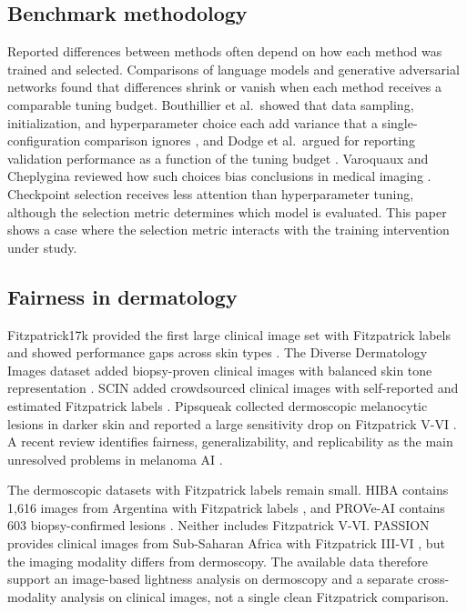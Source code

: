 \documentclass[11pt]{article}
\begin{document}
\subsection{Benchmark methodology}

Reported differences between methods often depend on how each method was trained and selected. Comparisons of language models \citep{melis2018evaluation} and generative adversarial networks \citep{lucic2018gans} found that differences shrink or vanish when each method receives a comparable tuning budget. Bouthillier et al.\ showed that data sampling, initialization, and hyperparameter choice each add variance that a single-configuration comparison ignores \citep{bouthillier2021variance}, and Dodge et al.\ argued for reporting validation performance as a function of the tuning budget \citep{dodge2019showyourwork}. Varoquaux and Cheplygina reviewed how such choices bias conclusions in medical imaging \citep{varoquaux2022failures}. Checkpoint selection receives less attention than hyperparameter tuning, although the selection metric determines which model is evaluated. This paper shows a case where the selection metric interacts with the training intervention under study.

\subsection{Fairness in dermatology}

Fitzpatrick17k provided the first large clinical image set with Fitzpatrick labels and showed performance gaps across skin types \citep{groh2021fitzpatrick17k}. The Diverse Dermatology Images dataset added biopsy-proven clinical images with balanced skin tone representation \citep{daneshjou2022ddi}. SCIN added crowdsourced clinical images with self-reported and estimated Fitzpatrick labels \citep{scin2024}. Pipsqueak collected dermoscopic melanocytic lesions in darker skin and reported a large sensitivity drop on Fitzpatrick V-VI \citep{ruga2026pipsqueak}. A recent review identifies fairness, generalizability, and replicability as the main unresolved problems in melanoma AI \citep{fairnessreview2024}.

The dermoscopic datasets with Fitzpatrick labels remain small. HIBA contains 1,616 images from Argentina with Fitzpatrick labels \citep{hiba2023}, and PROVe-AI contains 603 biopsy-confirmed lesions \citep{proveai2023}. Neither includes Fitzpatrick V-VI. PASSION provides clinical images from Sub-Saharan Africa with Fitzpatrick III-VI \citep{passion2024}, but the imaging modality differs from dermoscopy. The available data therefore support an image-based lightness analysis on dermoscopy and a separate cross-modality analysis on clinical images, not a single clean Fitzpatrick comparison.
\end{document}

